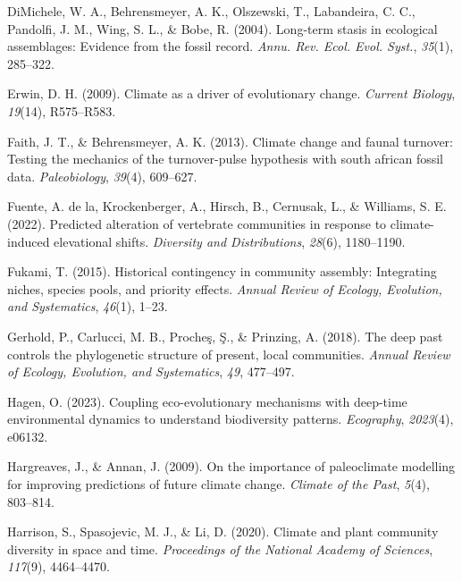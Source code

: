 \documentclass[
]{agujournal2019}
\newlength{\cslhangindent}
\newenvironment{CSLReferences}[2] %
 {\begin{list}{}{%
  \setlength{\itemindent}{0pt}
  \setlength{\leftmargin}{0pt}
  \setlength{\parsep}{0pt}
  \ifodd #1
   \setlength{\leftmargin}{\cslhangindent}
   \setlength{\itemindent}{-1\cslhangindent}
  \fi
  \setlength{\itemsep}{#2\baselineskip}}}
 {\end{list}}
\begin{document}
\begin{CSLReferences}{1}{0}
DiMichele, W. A., Behrensmeyer, A. K., Olszewski, T., Labandeira, C. C.,
Pandolfi, J. M., Wing, S. L., \& Bobe, R. (2004). Long-term stasis in
ecological assemblages: Evidence from the fossil record. \emph{Annu.
Rev. Ecol. Evol. Syst.}, \emph{35}(1), 285--322.

Erwin, D. H. (2009). Climate as a driver of evolutionary change.
\emph{Current Biology}, \emph{19}(14), R575--R583.

Faith, J. T., \& Behrensmeyer, A. K. (2013). Climate change and faunal
turnover: Testing the mechanics of the turnover-pulse hypothesis with
south african fossil data. \emph{Paleobiology}, \emph{39}(4), 609--627.

Fuente, A. de la, Krockenberger, A., Hirsch, B., Cernusak, L., \&
Williams, S. E. (2022). Predicted alteration of vertebrate communities
in response to climate-induced elevational shifts. \emph{Diversity and
Distributions}, \emph{28}(6), 1180--1190.

Fukami, T. (2015). Historical contingency in community assembly:
Integrating niches, species pools, and priority effects. \emph{Annual
Review of Ecology, Evolution, and Systematics}, \emph{46}(1), 1--23.

Gerhold, P., Carlucci, M. B., Procheş, Ş., \& Prinzing, A. (2018). The
deep past controls the phylogenetic structure of present, local
communities. \emph{Annual Review of Ecology, Evolution, and
Systematics}, \emph{49}, 477--497.

Hagen, O. (2023). Coupling eco-evolutionary mechanisms with deep-time
environmental dynamics to understand biodiversity patterns.
\emph{Ecography}, \emph{2023}(4), e06132.

Hargreaves, J., \& Annan, J. (2009). On the importance of paleoclimate
modelling for improving predictions of future climate change.
\emph{Climate of the Past}, \emph{5}(4), 803--814.

Harrison, S., Spasojevic, M. J., \& Li, D. (2020). Climate and plant
community diversity in space and time. \emph{Proceedings of the National
Academy of Sciences}, \emph{117}(9), 4464--4470.


\end{CSLReferences}
\end{document}
